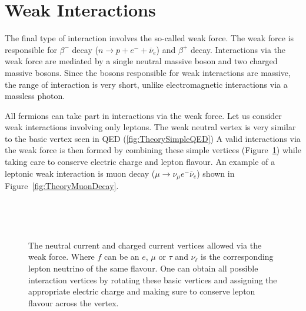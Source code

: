 \section{Weak Interactions} \label{sec:TheoryWeakInteractions}

The final type of interaction involves the so-called weak force. The weak force is responsible for $\beta^{-}$ decay ($n\rightarrow p +e^{-}+\overline{\nu}_{e}$) and $\beta^{+}$ decay. Interactions via the weak force are mediated by a single neutral massive boson and two charged massive bosons. Since the bosons responsible for weak interactions are massive, the range of interaction is very short, unlike electromagnetic interactions via a massless photon.

All fermions can take part in interactions via the weak force. Let us consider weak interactions involving only leptons. The weak neutral vertex is very similar to the basic vertex seen in QED (\ref{fig:TheorySimpleQED}) A valid interactions via the weak force is then formed by combining these simple vertices (Figure~\ref{fig:TheoryWeakVertexes}) while taking care to conserve electric charge and lepton flavour. An example of a leptonic weak interaction is muon decay ($\mu\rightarrow \nu_{\mu}e^{-}\overline{\nu}_{e}$) shown in Figure~\ref{fig:TheoryMuonDecay}.

\begin{figure}
  \begin{minipage}[][][t]{.32\textwidth}
    \centering
    
     \label{fig:TheoryWeakNeutralFermions}
  \end{minipage}
  \,
  \begin{minipage}[][][t]{.32\textwidth}
    \centering
    
     \label{fig:TheoryWeakChargedLeptons}
  \end{minipage}
  \,
  \begin{minipage}[][][t]{.32\textwidth}
    \centering
    
     \label{fig:TheoryWeakChargedQuarks}
  \end{minipage}

  \caption{The neutral current and charged current vertices allowed via the weak force. Where $f$ can be an $e$, $\mu$ or $\tau$ and $\nu_{\ell}$ is the corresponding lepton neutrino of the same flavour. 
  One can obtain all possible interaction vertices by rotating these basic vertices and assigning the appropriate electric charge and making sure to conserve lepton flavour across the vertex.} \label{fig:TheoryWeakVertexes}
\end{figure}

